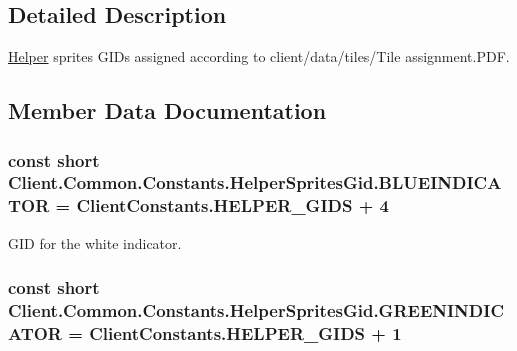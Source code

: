\subsection{Detailed Description}
\hyperlink{namespaceClient_1_1Common_1_1Helper}{Helper} sprites G\+I\+Ds assigned according to \textquotesingle{}client/data/tiles/\+Tile assignment.\+P\+D\+F\textquotesingle{}. 



\subsection{Member Data Documentation}
\hypertarget{classClient_1_1Common_1_1Constants_1_1HelperSpritesGid_ad82a28d98b8e1e3e8986fa33b4305f54}{}
\subsubsection[{B\+L\+U\+E\+I\+N\+D\+I\+C\+A\+T\+O\+R}]{\setlength{\rightskip}{0pt plus 5cm}const short Client.\+Common.\+Constants.\+Helper\+Sprites\+Gid.\+B\+L\+U\+E\+I\+N\+D\+I\+C\+A\+T\+O\+R = {\bf Client\+Constants.\+H\+E\+L\+P\+E\+R\+\_\+\+G\+I\+D\+S} + 4}\label{classClient_1_1Common_1_1Constants_1_1HelperSpritesGid_ad82a28d98b8e1e3e8986fa33b4305f54}


G\+I\+D for the white indicator. 

\hypertarget{classClient_1_1Common_1_1Constants_1_1HelperSpritesGid_ac596caabc3769ddfec43aa6360d95715}{}
\subsubsection[{G\+R\+E\+E\+N\+I\+N\+D\+I\+C\+A\+T\+O\+R}]{\setlength{\rightskip}{0pt plus 5cm}const short Client.\+Common.\+Constants.\+Helper\+Sprites\+Gid.\+G\+R\+E\+E\+N\+I\+N\+D\+I\+C\+A\+T\+O\+R = {\bf Client\+Constants.\+H\+E\+L\+P\+E\+R\+\_\+\+G\+I\+D\+S} + 1}\label{classClient_1_1Common_1_1Constants_1_1HelperSpritesGid_ac596caabc3769ddfec43aa6360d95715}


